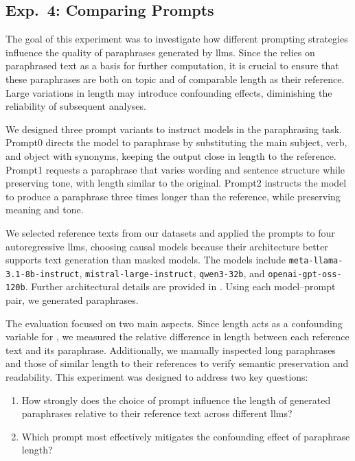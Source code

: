 \subsection{Exp.\ 4: Comparing Prompts}%
\label{subsec:prompt_impact}

The goal of this experiment was to investigate how different prompting strategies influence the quality of paraphrases generated by \acp{llm}.  
Since the \impAppr{} relies on paraphrased text as a basis for further computation, it is crucial to ensure that these paraphrases are both on topic and of comparable length as their reference.  
Large variations in length may introduce confounding effects, diminishing the reliability of subsequent analyses.

We designed three prompt variants to instruct models in the paraphrasing task.
Prompt0 directs the model to paraphrase by substituting the main subject, verb, and object with synonyms, keeping the output close in length to the reference.  
Prompt1 requests a paraphrase that varies wording and sentence structure while preserving tone, with length similar to the original.  
Prompt2 instructs the model to produce a paraphrase three times longer than the reference, while preserving meaning and tone. 

We selected reference texts from our datasets and applied the prompts to four autoregressive \acp{llm}, choosing causal models because their architecture better supports text generation than masked models. 
The models include \texttt{meta-llama-3.1-8b-instruct}, \texttt{mistral-large-instruct}, \texttt{qwen3-32b}, and \texttt{openai-gpt-oss-120b}.
Further architectural details are provided in . 
Using each model–prompt pair, we generated paraphrases.

The evaluation focused on two main aspects. 
Since length acts as a confounding variable for \imps{}, we measured the relative difference in length between each reference text and its paraphrase. 
Additionally, we manually inspected long paraphrases and those of similar length to their references to verify semantic preservation and readability.
This experiment was designed to address two key questions:
\begin{enumerate}
\item How strongly does the choice of prompt influence the length of generated paraphrases relative to their reference text across different \acp{llm}?
\item Which prompt most effectively mitigates the confounding effect of paraphrase length?
\end{enumerate}
